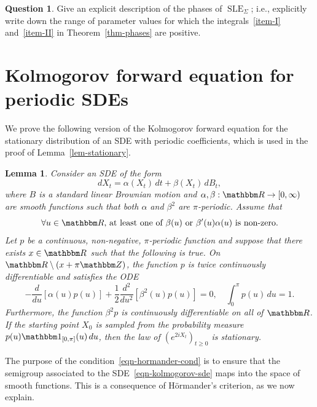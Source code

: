 \documentclass[11pt]{article}
\theoremstyle{plain}
\newtheorem{lem}[thm]{Lemma}
\theoremstyle{definition}
\newtheorem{ques}[thm]{Question}
\numberwithin{equation}{section}
\newcommand{\eqb}{\begin{equation}}
\newcommand{\eqe}{\end{equation}}
\newcommand{\BB}{\mathbbm}
\newcommand{\rta}{\rightarrow}
\newcommand{\SLEG}{{\operatorname{SLE}}_\Sigma}
\begin{document}
\begin{ques}
Give an explicit description of the phases of $\SLEG$; i.e., explicitly write down the range of parameter values for which the integrals~\ref{item-I} and~\ref{item-II} in Theorem~\ref{thm-phases} are positive.
\end{ques}








\appendix

\section{Kolmogorov forward equation for periodic SDEs}
 
We prove the following version of the Kolmogorov forward equation for the stationary distribution of an SDE with periodic coefficients, which is used in the proof of Lemma~\ref{lem-stationary}. 

\begin{lem} \label{lem-kolmogorov}
Consider an SDE of the form
\eqb \label{eqn-kolmogorov-sde}
dX_t = \alpha(X_t) \,dt +  \beta(X_t)  \,dB_t ,
\eqe 
where $B$ is a standard linear Brownian motion and $\alpha  , \beta : \BB R \rta [0,\infty)$ are smooth functions such that both $\alpha$ and $\beta^2$ are $\pi$-periodic. Assume that
\eqb \label{eqn-hormander-cond}
\text{$\forall u \in \BB R$, at least one of $\beta(u)$ or $\beta'(u)\alpha(u)$ is non-zero}.  
\eqe
Let $p$ be a continuous, non-negative, $\pi$-periodic function and suppose that there exists $x\in\BB R$ such that the following is true. 
On $\BB R \setminus (x+\pi \BB Z)$, the function $p$ is twice continuously differentiable and satisfies the ODE
\eqb \label{eqn-kolmogorov}
- \frac{d}{du} [ \alpha(u) p (u) ] + \frac12  \frac{d^2}{du^2} [ \beta^2(u) p (u)]  = 0,\quad \int_0^{\pi} p(u) \,du = 1 .
\eqe
Furthermore, the function $\beta^2 p$ is continuously differentiable on all of $\BB R$. 
If the starting point $X_0$ is sampled from the probability measure $p(u) \BB 1_{[0,\pi]}(u)\,du$, then the law of $(e^{2 i X_t})_{t\geq 0}$ is stationary.
\end{lem}


The purpose of the condition~\eqref{eqn-hormander-cond} is to ensure that the semigroup associated to the SDE~\eqref{eqn-kolmogorov-sde} maps into the space of smooth functions. This is a consequence of H\"ormander's criterion, as we now explain.  
\end{document}
